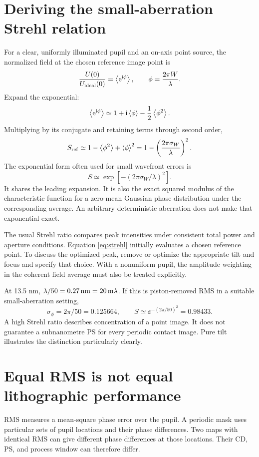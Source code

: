 \section{Deriving the small-aberration Strehl relation}
For a clear, uniformly illuminated pupil and an on-axis point source,
the normalized field at the chosen reference image point is
\[
\frac{U(0)}{U_{\rm ideal}(0)}
=\left\langle \mathrm{e}^{\mathrm{i}\phi}\right\rangle,\qquad \phi=\frac{2\pi W}{\lambda}.
\]
Expand the exponential:
\[
\left\langle \mathrm{e}^{\mathrm{i}\phi}\right\rangle\simeq
1+\mathrm{i}\left\langle \phi\right\rangle-\frac12\left\langle \phi^2\right\rangle.
\]
Multiplying by its conjugate and retaining terms through second order,
\begin{equation}
S_{\rm ref}\simeq1-\left\langle \phi^2\right\rangle+\left\langle \phi\right\rangle^2
=1-\left(\frac{2\pi\sigma_W}{\lambda}\right)^2.
\label{eq:strehl}
\end{equation}
The exponential form often used for small wavefront errors is
\begin{equation}
S\simeq\exp[-(2\pi\sigma_W/\lambda)^2].
\label{eq:marechal}
\end{equation}
It shares the leading expansion. It is also the exact squared modulus
of the characteristic function for a zero-mean Gaussian phase distribution
under the corresponding average. An arbitrary deterministic aberration
does not make that exponential exact.

The usual Strehl ratio compares peak intensities under consistent total
power and aperture conditions. Equation \eqref{eq:strehl} initially evaluates
a chosen reference point. To discuss the optimized peak, remove or optimize
the appropriate tilt and focus and specify that choice.
With a nonuniform pupil, the amplitude weighting in the coherent field
average must also be treated explicitly.

At 13.5 nm, $\lambda/50=0.27\,\mathrm{nm}=20\,\mathrm{m}\lambda$.
If this is piston-removed RMS in a suitable small-aberration setting,
\[
\sigma_\phi=2\pi/50=0.125664,\qquad
S\simeq\ee^{-(2\pi/50)^2}=0.98433.
\]
A high Strehl ratio describes concentration of a point image. It does
not guarantee a subnanometre PS for every periodic contact image.
Pure tilt illustrates the distinction particularly clearly.

\section{Equal RMS is not equal lithographic performance}
RMS measures a mean-square phase error over the pupil. A periodic mask
uses particular sets of pupil locations and their phase differences.
Two maps with identical RMS can give different phase differences at
those locations. Their CD, PS, and process window can therefore differ.

